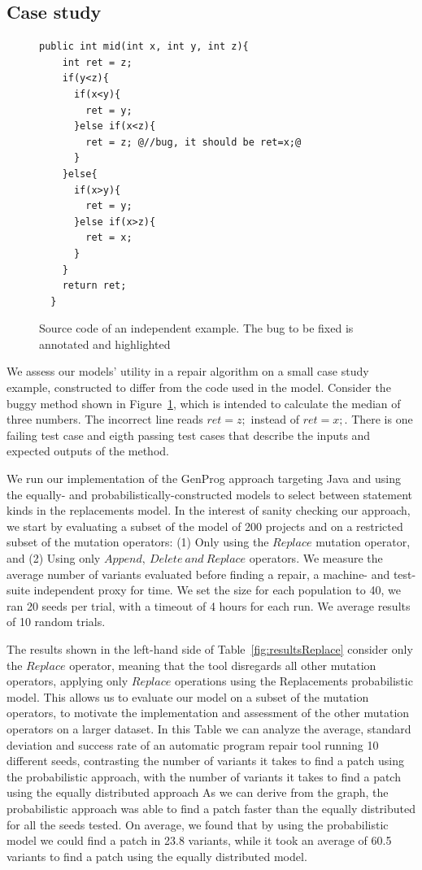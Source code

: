 \documentclass[conference]{IEEEtran}
\begin{document}
\subsection{Case study}
\label{sec:casestudy}


\begin{figure}[t]
\begin{lstlisting}[frame=single,style=base]
  public int mid(int x, int y, int z){
    int ret = z;  
    if(y<z){
      if(x<y){
        ret = y;
      }else if(x<z){
        ret = z; @//bug, it should be ret=x;@
      }
    }else{
      if(x>y){
        ret = y;
      }else if(x>z){
        ret = x;
      }
    }
    return ret;
  }	
	\end{lstlisting}
	\caption{Source code of an independent example. The bug to be fixed is annotated and highlighted}
	\label{fig:initialExample}
\end{figure}

We assess our
models' utility in a repair algorithm on a small case study example, constructed
to differ from the code used in the model.  Consider the buggy method shown in
Figure~\ref{fig:initialExample}, which is intended to  calculate the median 
of three numbers.  The incorrect line reads 
$ret = z;$ instead of $ret = x;$. There is one failing test case and eigth passing test cases that describe the inputs and expected outputs of the method.

We run our implementation of the GenProg approach targeting Java and using the
equally- and probabilistically-constructed models to select between statement kinds in the replacements model. In the interest of sanity checking our approach, we 
start by evaluating a subset of the model of 200 projects and on a restricted subset of 
the mutation operators: (1) Only using the $Replace$ mutation operator, and (2) Using only $Append,~
Delete~and~Replace$ operators.  We measure the average number of variants
evaluated before finding a repair, a machine- and test-suite independent proxy
for time. We set the size for each population to 40, we ran 20
seeds per trial, with a timeout of 4 hours for each run.  We average results of 10 random trials.

The results shown in the left-hand side of Table~\ref{fig:resultsReplace} consider only the $Replace$ operator, meaning that the tool disregards all other mutation 
operators, applying only $Replace$ operations using the Replacements probabilistic model.
This allows us to evaluate our model on a 
subset of the mutation operators, to motivate the implementation and assessment of the other mutation operators on a larger dataset. 
%
In this Table we can analyze the average, standard deviation and success rate of an automatic program repair tool running 10 different seeds, contrasting the 
number of variants it takes to find a patch using the probabilistic approach, with the number of variants it takes to find a patch using the 
equally distributed approach 
%
As we can derive from the graph, the probabilistic approach was able to find a 
patch faster than the equally distributed for all the seeds tested. On average,
we found that by using the probabilistic model we  
could find a patch in 23.8 variants, while it took an average of 60.5 variants 
to find a patch using the equally distributed model.
\end{document}
